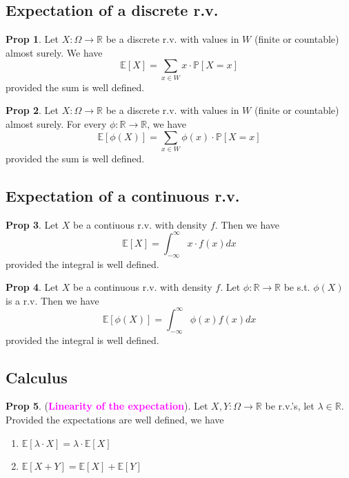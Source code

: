 \documentclass[8pt,a4paper,landscape]{article}
\theoremstyle{definition}
\theoremstyle{example}
\theoremstyle{intuition}
\theoremstyle{definition}
\newtheorem{proposition}{Prop}[section]
\newcommand{\mydef}[1]{\textcolor{magenta}{\textbf{#1}}}
\newcommand{\prob}[1]{\mathbb{P}\left[ #1 \right]}
\newcommand{\expec}[1]{\mathbb{E}\left[ #1 \right]}
\begin{document}
\begin{multicols}{3}
		\subsection{Expectation of a discrete r.v.}
			\begin{proposition}
				Let $X : \Omega \to \mathbb{R}$ be a discrete r.v. with values in $W$ (finite or countable) almost surely. We have
				$$
					\expec{X} = \sum_{x \in W} x \cdot \prob{X = x}
				$$
				provided the sum is well defined.
			\end{proposition}

			\begin{proposition}
				Let $X : \Omega \to \mathbb{R}$ be a discrete r.v. with values in $W$ (finite or countable) almost surely. For every $\phi : \mathbb{R} \to \mathbb{R}$, we have
				$$
					\expec{\phi(X)} = \sum_{x \in W} \phi(x) \cdot \prob{X = x}
				$$
				provided the sum is well defined.
			\end{proposition}


		\subsection{Expectation of a continuous r.v.}
			\begin{proposition}
				Let $X$ be a contiuous r.v. with density $f$. Then we have 
				$$
					\expec{X} = \int_{-\infty}^\infty x \cdot f(x) dx
				$$
				provided the integral is well defined.
			\end{proposition}

			\begin{proposition}
				Let $X$ be a continuous r.v. with density $f$. Let $\phi : \mathbb{R} \to \mathbb{R}$ be s.t. $\phi(X)$ is a r.v. Then we have
				$$
					\expec{\phi(X)} = \int_{-\infty}^\infty \phi(x) f(x) dx
				$$
				provided the integral is well defined.
			\end{proposition}


		\subsection{Calculus}
			\begin{proposition}
				(\mydef{Linearity of the expectation}). Let $X,Y : \Omega \to \mathbb{R}$ be r.v.'s, let $\lambda \in \mathbb{R}$. Provided the expectations are well defined, we have 
				\begin{enumerate}
					\item $\expec{\lambda \cdot X} = \lambda \cdot \expec{X}$
					\item $\expec{X + Y} = \expec{X} + \expec{Y}$
				\end{enumerate}
			\end{proposition}


\end{multicols}
\end{document}
